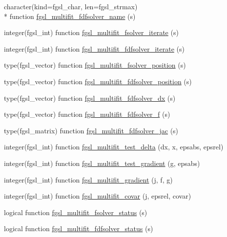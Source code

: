 \begin{DoxyCompactItemize}
\item 
character(kind=fgsl\-\_\-char, len=fgsl\-\_\-strmax) \\*
function \hyperlink{multifit_8finc_a771b7c045ca45cddece1bab084d81687}{fgsl\-\_\-multifit\-\_\-fdfsolver\-\_\-name} (s)
\item 
integer(fgsl\-\_\-int) function \hyperlink{multifit_8finc_a6262c763ec214a5143c1aec91f5f61a0}{fgsl\-\_\-multifit\-\_\-fsolver\-\_\-iterate} (s)
\item 
integer(fgsl\-\_\-int) function \hyperlink{multifit_8finc_a62a0cfaf39d63305b4e9ec2feae62e58}{fgsl\-\_\-multifit\-\_\-fdfsolver\-\_\-iterate} (s)
\item 
type(fgsl\-\_\-vector) function \hyperlink{multifit_8finc_ae18bf66b9d8137530d9e00d789cd1b47}{fgsl\-\_\-multifit\-\_\-fsolver\-\_\-position} (s)
\item 
type(fgsl\-\_\-vector) function \hyperlink{multifit_8finc_a21df223213883480f389a670b22333a2}{fgsl\-\_\-multifit\-\_\-fdfsolver\-\_\-position} (s)
\item 
type(fgsl\-\_\-vector) function \hyperlink{multifit_8finc_a5d5d7621f0e81fd1eaf2c01119a9e9ee}{fgsl\-\_\-multifit\-\_\-fdfsolver\-\_\-dx} (s)
\item 
type(fgsl\-\_\-vector) function \hyperlink{multifit_8finc_af31bdf3274659259d4a5bc4eb3e93275}{fgsl\-\_\-multifit\-\_\-fdfsolver\-\_\-f} (s)
\item 
type(fgsl\-\_\-matrix) function \hyperlink{multifit_8finc_ab24fe31ab5a3648bb2aeb958e0a5e2e9}{fgsl\-\_\-multifit\-\_\-fdfsolver\-\_\-jac} (s)
\item 
integer(fgsl\-\_\-int) function \hyperlink{multifit_8finc_a32b6331d1e1c82610b617328dc3234cf}{fgsl\-\_\-multifit\-\_\-test\-\_\-delta} (dx, x, epsabs, epsrel)
\item 
integer(fgsl\-\_\-int) function \hyperlink{multifit_8finc_a6f3f38114ba37459b8d28d7757b0ae3c}{fgsl\-\_\-multifit\-\_\-test\-\_\-gradient} (g, epsabs)
\item 
integer(fgsl\-\_\-int) function \hyperlink{multifit_8finc_a0451b9c85929c00cd7c5a6ad103dfea3}{fgsl\-\_\-multifit\-\_\-gradient} (j, f, g)
\item 
integer(fgsl\-\_\-int) function \hyperlink{multifit_8finc_a843fbc4d78a3e84e537c8b2c10eff8ef}{fgsl\-\_\-multifit\-\_\-covar} (j, epsrel, covar)
\item 
logical function \hyperlink{multifit_8finc_a3945d89bd5d38c87bb6808ee41382e31}{fgsl\-\_\-multifit\-\_\-fsolver\-\_\-status} (s)
\item 
logical function \hyperlink{multifit_8finc_ae28da5d71114b0974e5da3acd305fe34}{fgsl\-\_\-multifit\-\_\-fdfsolver\-\_\-status} (s)

\end{DoxyCompactItemize}
